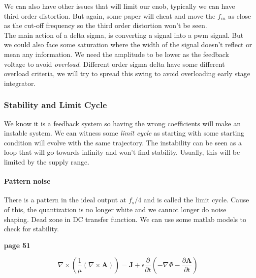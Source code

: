\documentclass[
  a4paper,
]{article}
\begin{document}
We can also have other issues that will limit our {enob}, typically we
can have third order distortion. But again, some paper will cheat and
move the \(f_{in}\) as close as the cut-off frequency so the third order
distortion won't be seen.\\
The main action of a delta sigma, is converting a signal into a {pwm}
signal. But we could also face some saturation where the width of the
signal doesn't reflect or mean any information. We need the amplitude to
be lower as the feedback voltage to avoid \emph{overload}. Different
order sigma delta have some different overload criteria, we will try to
spread this swing to avoid overloading early stage integrator.

\hypertarget{stability-and-limit-cycle}{%
\subsubsection{Stability and Limit
Cycle}\label{stability-and-limit-cycle}}

We know it is a feedback system so having the wrong coefficients will
make an instable system. We can witness some \emph{limit cycle} as
starting with some starting condition will evolve with the same
trajectory. The instability can be seen as a loop that will go towards
infinity and won't find stability. Usually, this will be limited by the
supply range.

\hypertarget{pattern-noise}{%
\paragraph{Pattern noise}\label{pattern-noise}}

There is a pattern in the ideal output at \(f_s / 4\) and is called the
limit cycle. Cause of this, the quantization is no longer white and we
cannot longer do noise shaping. Dead zone in DC transfer function. We
can use some matlab models to check for stability.

\textbf{page 51}

\[\nabla \times \left( \frac{1}{\mu} (\nabla \times \mathbf{A}) \right) = \mathbf{J} + \epsilon \frac{\partial}{\partial t} \left( -\nabla \Phi - \frac{\partial \mathbf{A}}{\partial t} \right)\]
\end{document}
